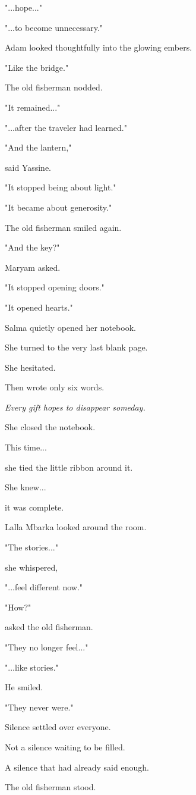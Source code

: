 \documentclass[12pt,openany]{book}
\begin{document}
"...hope..."

"...to become unnecessary."

Adam looked thoughtfully into the glowing embers.

"Like the bridge."

The old fisherman nodded.

"It remained..."

"...after the traveler had learned."

"And the lantern,"

said Yassine.

"It stopped being about light."

"It became about generosity."

The old fisherman smiled again.

"And the key?"

Maryam asked.

"It stopped opening doors."

"It opened hearts."

Salma quietly opened her notebook.

She turned to the very last blank page.

She hesitated.

Then wrote only six words.

\emph{Every gift hopes to disappear someday.}

She closed the notebook.

This time...

she tied the little ribbon around it.

She knew...

it was complete.

Lalla Mbarka looked around the room.

"The stories..."

she whispered,

"...feel different now."

"How?"

asked the old fisherman.

"They no longer feel..."

"...like stories."

He smiled.

"They never were."

Silence settled over everyone.

Not a silence waiting to be filled.

A silence that had already said enough.

The old fisherman stood.
\end{document}
